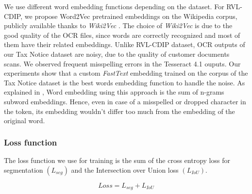 \documentclass[runningheads]{llncs}
\begin{document}
We use different word embedding functions depending on the dataset. For RVL-CDIP, we propose Word2Vec pretrained embeddings on the Wikipedia corpus, publicly available thanks to \textit{Wiki2Vec} \cite{wiki2vec}. The choice of \textit{Wiki2Vec} is due to the good quality of the OCR files, since words are correctly recognized and most of them have their related embeddings. Unlike RVL-CDIP dataset, OCR outputs of our Tax Notice dataset are noisy, due to the quality of customer documents scans. We observed frequent misspelling errors in the Tesseract 4.1 \cite{tesseract} ouputs. Our experiments show that a custom \textit{ FastText} embedding trained on the corpus of the Tax Notice dataset is the best words embedding function to handle the noise. As explained in \cite{fasttext}, Word embedding using this approach is the sum of n-grams subword embeddings. Hence, even in case of a misspelled or  dropped character in the token, its embedding wouldn't differ too much from the embedding of the original word.

\subsubsection{Loss function}\hfill

The loss function we use for training is the sum of the cross entropy loss for segmentation $(L_{seg})$ and the Intersection over Union loss $(L_{IoU})$.

\begin{equation}
   Loss = L_{seg} + L_{IoU}
   \label{eq4}
\end{equation}
\end{document}
